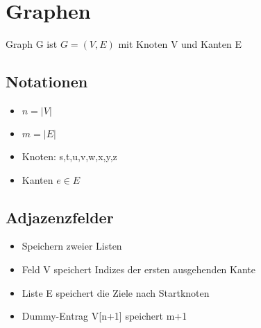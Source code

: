 \section{Graphen}
Graph G ist $G = (V,E)$ mit Knoten V und Kanten E
\subsection{Notationen}
\begin{itemize}
    \item $n = |V|$
    \item $m = |E|$
    \item Knoten: s,t,u,v,w,x,y,z
    \item Kanten $e \in E$
\end{itemize}

\subsection{Adjazenzfelder}
\begin{itemize}
    \item Speichern zweier Listen
    \item Feld V speichert Indizes der ersten ausgehenden Kante
    \item Liste E speichert die Ziele nach Startknoten
    \item Dummy-Entrag V[n+1] speichert m+1
\end{itemize}
